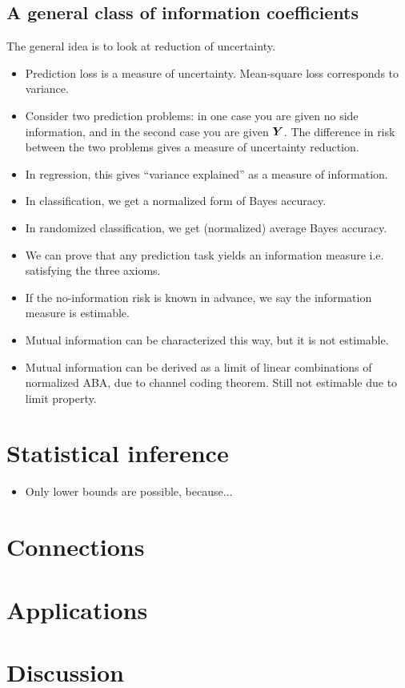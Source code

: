 \documentclass[12pt]{article}
\begin{document}
\subsection{A general class of information coefficients}\label{sec:gen_class_sub}

The general idea is to look at reduction of uncertainty.

\begin{itemize}
\item 
Prediction loss is a measure of uncertainty.  Mean-square loss
corresponds to variance.
\item 
Consider two prediction problems: in one case you are given no side
information, and in the second case you are given $\boldsymbol{Y}$.  The
difference in risk between the two problems gives a measure of
uncertainty reduction.
\item
In regression, this gives ``variance explained'' as a measure of
information.
\item
In classification, we get a normalized form of Bayes accuracy.
\item
In randomized classification, we get (normalized) average Bayes accuracy.
\item
We can prove that any prediction task yields an information measure
i.e. satisfying the three axioms.
\item
If the no-information risk is known in advance, we say the information
measure is estimable.
\item
Mutual information can be characterized this way, but it is not estimable.
\item
Mutual information can be derived as a limit of linear combinations of
normalized ABA, due to channel coding theorem.  Still not estimable
due to limit property.
\end{itemize}

\section{Statistical inference}\label{sec:inference}

\begin{itemize}
\item Only lower bounds are possible, because...
\end{itemize}

\section{Connections}\label{sec:connections}

\section{Applications}\label{sec:applications}

\section{Discussion}\label{sec:discussion}
\end{document}
